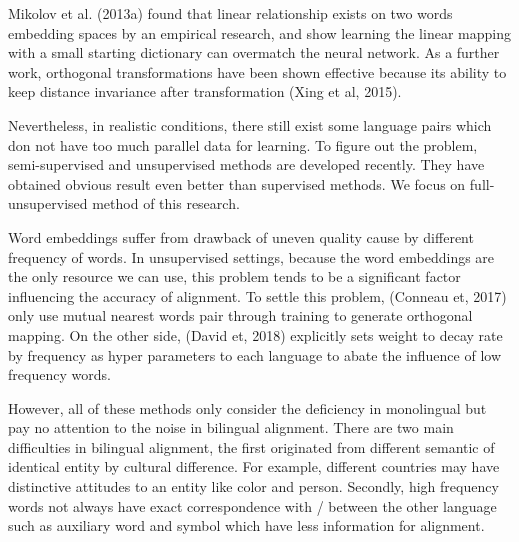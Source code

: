 Mikolov et al. (2013a) found that linear relationship exists 
	on two words embedding spaces by an empirical research, 
	and show learning the linear mapping with a small starting dictionary can overmatch the neural network.
As a further work, 
	orthogonal transformations have been shown effective 
	because its ability to keep distance invariance after transformation (Xing et al, 2015). 

Nevertheless, 
	in realistic conditions, 
	there still exist some language pairs which don not have too much parallel data for learning. 
To figure out the problem, 
	semi-supervised and unsupervised methods are developed recently. 
They have obtained obvious result even better than supervised methods. 
We focus on full-unsupervised method of this research. 

Word embeddings suffer from drawback of uneven quality cause 
	by different frequency of words. 
In unsupervised settings, 
	because the word embeddings are the only resource we can use, 
	this problem tends to be a significant factor influencing the accuracy of alignment. 
To settle this problem, 
	(Conneau et, 2017) only use mutual nearest words pair 
	through training to generate orthogonal mapping. 
On the other side, 
	(David et, 2018) explicitly sets weight to decay rate 
	by frequency as hyper parameters to each language 
	to abate the influence of low frequency words. 

However, 
	all of these methods only consider the deficiency 
	in monolingual but pay no attention to the noise in bilingual alignment. 
There are two main difficulties in bilingual alignment, 
	the first originated from different semantic of identical entity by cultural difference. 
For example, 
	different countries may have distinctive attitudes to an entity like color and person. 
Secondly, 
	high frequency words not always have exact correspondence with / between 
	the other language such as auxiliary word and symbol which have less information for alignment. 

